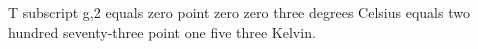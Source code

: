 T subscript g,2 equals zero point zero zero three degrees Celsius equals two hundred seventy-three point one five three Kelvin.